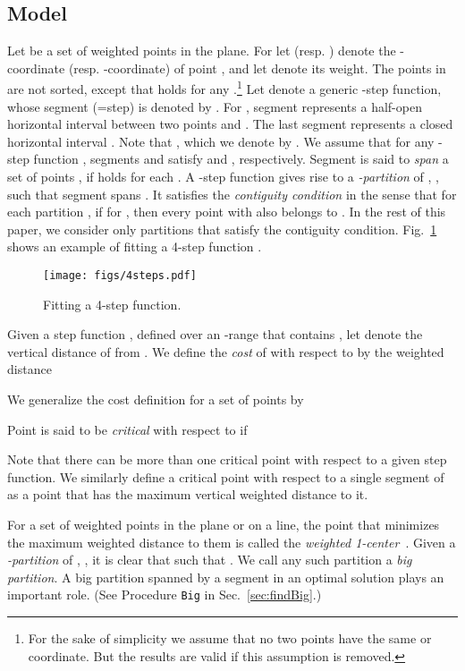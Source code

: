 \documentclass[preprint,10pt]{elsarticle}
\begin{document}
\subsection{Model}\label{sec:model}
Let  be a set of  weighted points in the plane.
For  let  (resp. ) denote the -coordinate (resp. -coordinate)
of point , and let  denote its weight.
The points in  are not sorted,
except that  holds for any .\footnote{For the sake
of simplicity we assume that no two points have the same  or  coordinate.
But the results are valid if this assumption is removed.
}
Let  denote a generic -step function,
whose  segment (=step) is denoted by .
For , segment  represents a half-open horizontal interval 
between two points  and .
The last segment  represents a closed horizontal interval .
Note that ,
which we denote by .
We assume that for any -step function ,
 segments  and  satisfy  and ,
respectively.
Segment  is said to {\em span} a set of points ,
if  holds for each .
A -step function  gives rise to a {\em -partition} of , 
,
 such that segment  spans .
 It satisfies the {\em contiguity condition} in the sense that for each partition ,
if  for ,
then every point  with  also belongs to .
In the rest of this paper, we
consider only partitions that satisfy the contiguity condition.
Fig.~\ref{fig:4steps} shows an example of fitting a 4-step function .
\begin{figure}[ht]
\centering
\texttt{[image: figs/4steps.pdf]}
\hspace{2mm}
\caption{Fitting a 4-step function.
}
\label{fig:4steps}
\end{figure}

Given a step function , 
defined over an -range that contains ,
let  denote the vertical distance of  from .
We define the {\em cost} of  with respect to 
by the weighted distance

We generalize the cost definition for a set  of points by

Point  is said to be {\em critical} with respect to  if

Note that there can be more than one critical point with respect to a given step function.
We similarly define a critical point with respect to a single segment of 
as a point that has the maximum vertical weighted distance to it.

For a set of weighted points in the plane or on a line,
the point that minimizes the maximum weighted distance to
them is called the {\em weighted 1-center}~\cite{bhattacharya2007}.
Given a {\em -partition} of , 
,
it is clear that  such that .
We call any such partition a {\em big partition}.
A big partition spanned by a segment in an optimal solution plays an important role.
(See Procedure {\tt Big} in Sec.~\ref{sec:findBig}.)
\end{document}

